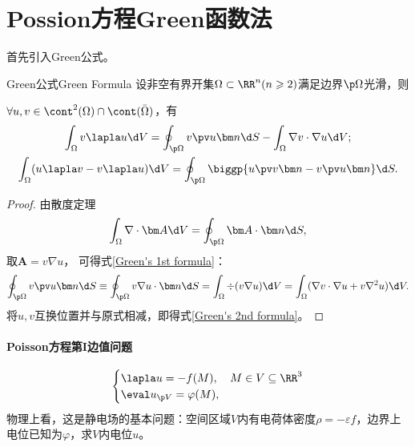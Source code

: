 \section{Possion方程Green函数法}
首先引入Green公式。
\begin{theorem}{Green公式}{Green Formula}
	设非空有界开集$\Omega\subset\RR^n(n\geqslant 2)$满足边界$\p\Omega$光滑，则
	
	$\forall u,v\in\cont^2(\Omega)\cap\cont(\bar\Omega)$，有
	\begin{gather}
		\label{Green's 1st formula}
		\int_\Omega v\lapla u\d V=\oint_{\p\Omega}v\pv u{\bm n}\d S-\int_\Omega\nabla v\cdot\nabla u\d V;\\
		\label{Green's 2nd formula}
		\int_\Omega(u\lapla v-v\lapla u)\d V=\oint_{\p\Omega}\biggp{u\pv v{\bm n}-v\pv u{\bm n}}\d S.
	\end{gather}
\end{theorem}
\begin{proof}
	由散度定理
	\begin{align}
		\int_\Omega\nabla\cdot\bm A\d V=\oint_{\p\Omega}\bm A\cdot\bm n\d S,
	\end{align}
	取$\bm A=v\nabla u$，
	可得式\eqref{Green's 1st formula}：
	\[
		\oint_{\p\Omega}v\pv u{\bm n}\d S\equiv\oint_{\p\Omega}v\nabla u\cdot\bm n\d S=\int_\Omega\div(v\nabla u)\d V=\int_\Omega(\nabla v\cdot\nabla u+v\nabla^2u)\d V.
	\]
	将$u,v$互换位置并与原式相减，即得式\eqref{Green's 2nd formula}。
\end{proof}
\paragraph{Poisson方程第I边值问题}
\begin{align}
	\begin{cases}
		\lapla u=-f(M),&M\in V\subseteq\RR^3\\
		\eval u_{\p V}=\varphi(M),
	\end{cases}
\end{align}
物理上看，这是静电场的基本问题：空间区域$V$内有电荷体密度$\rho=-\varepsilon f$，边界上电位已知为$\varphi$，求$V$内电位$u$。

